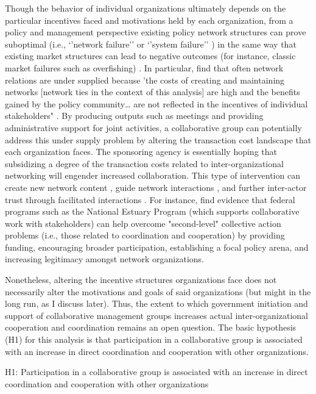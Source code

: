 \documentclass[12pt,a4paper,titlepage]{article}
\begin{document}
Though the behavior of individual organizations ultimately depends on the particular incentives faced and motivations held by each organization, from a policy and management perspective existing policy network structures can prove suboptimal (i.e., `'network failure'' \parencite{schrank2011} or `'system failure'' \parencite{carlsson1997}) in the same way that existing market structures can lead to negative outcomes (for instance, classic market failures such as overfishing) \parencite{weimer2010}. In particular, \textcite{schneider2003} find that often network relations are under supplied because 'the costs of creating and maintaining networks [network ties in the context of this analysis] are high and the benefits gained by the policy community… are not reflected in the incentives of individual stakeholders" \parencite[144]{schneider2003}. By producing outputs such as meetings and providing administrative support for joint activities, a collaborative group can potentially address this under supply problem by altering the transaction cost landscape that each organization faces. The sponsoring agency is essentially hoping that subsidizing a degree of the transaction costs related to inter-organizational networking will engender increased collaboration. This type of intervention can create new network content \parencite{koppenjan2004}, guide network interactions \parencite{kickert1997,mandell1990}, and further inter-actor trust through facilitated interactions \parencite{klijn2010}. For instance, \textcite{schneider2003} find evidence that federal programs such as the National Estuary Program (which supports collaborative work with stakeholders) can help overcome "second-level" collective action problems (i.e., those related to coordination and cooperation) by providing funding, encouraging broader participation, establishing a focal policy arena, and increasing legitimacy amongst network organizations. 

Nonetheless, altering the incentive structures organizations face does not necessarily alter the motivations and goals of said organizations (but might in the long run, as I discuss later). Thus, the extent to which government initiation and support of collaborative management groups increases actual inter-organizational cooperation and coordination remains an open question. The basic hypothesis (H1) for this analysis is that participation in a collaborative group is associated with an increase in direct coordination and cooperation with other organizations. 

\singlespacing
\begin{description}
\item{H1: Participation in a collaborative group is associated with an increase in direct coordination and cooperation with other organizations}
\end{description}
\doublespacing
\end{document}
